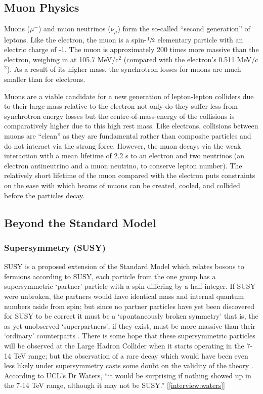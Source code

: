 \subsection{Muon Physics}
Muons ($\mu^{-}$) and muon neutrinos ($\nu_{\mu}$) form the so-called ``second generation'' of leptons. Like the electron, the muon is a spin-$\sfrac{1}{2}$ elementary particle with an electric charge of -1. The muon is approximately 200 times more massive than the electron, weighing in at 105.7 MeV/c$^{2}$ (compared with the electron's 0.511 MeV/c$^{2}$). As a result of its higher mass, the synchrotron losses for muons are much smaller than for electrons.

Muons are a viable candidate for a new generation of lepton-lepton colliders due to their large mass relative to the electron \textendash not only do they suffer less from synchrotron energy losses but the centre-of-mass-energy of the collisions is comparatively higher due to this high rest mass. Like electrons, collisions between muons are ``clean'' as they are fundamental rather than composite particles and do not interact via the strong force. However,  the muon decays via the weak interaction with a mean lifetime of 2.2 \textmu s to an electron and two neutrinos (an electron antineutrino and a muon neutrino, to conserve lepton number). The relatively short lifetime of the muon compared with the electron puts constraints on the ease with which beams of muons can be created, cooled, and collided before the particles decay.

\subsection{Beyond the Standard Model}
\subsubsection{Supersymmetry (SUSY)}
SUSY is a proposed extension of the Standard Model which relates bosons to fermions \textendash  according to SUSY, each particle from the one group has a supersymmetric ‘partner' particle with a spin differing by a half-integer. If SUSY were unbroken, the partners would have identical mass and internal quantum numbers aside from spin; but since no partner particles have yet been discovered for SUSY to be correct it must be a `spontaneously broken symmetry' \textendash that is, the as-yet unobserved `superpartners', if they exist, must be more massive than their `ordinary' counterparts \cite{CERN:Supersymmetry}. There is some hope that these supersymmetric particles will be observed at the Large Hadron Collider when it starts operating in the 7-14 TeV range; but the observation of a rare decay which would have been even less likely under supersymmetry casts some doubt on the validity of the theory \cite{BBC:SUSY}. According to UCL's Dr Waters, ``it would be surprising if nothing showed up in the 7-14 TeV range, although it may not be SUSY.'' [\ref{interview:waters}]

